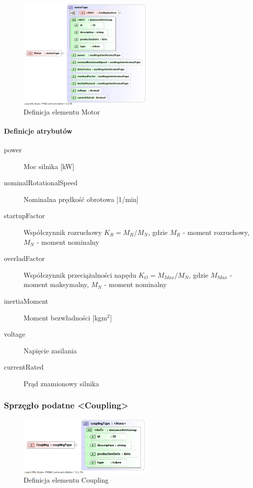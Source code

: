 \documentclass[12pt,a4paper]{article}
\begin{document}
\begin{figure}[h]
  \centering
  \includegraphics[width=0.6\textwidth]{png/liquid/Motor}
  \caption{Definicja elementu Motor}
  \label{fig:motor-xsd}
\end{figure}

\paragraph{Definicje atrybutów}
\begin{description}
\item[power] Moc silnika [kW]
\item[nominalRotationalSpeed] Nominalna prędkość obrotowa [1/min]
\item[startupFactor] Współczynnik rozruchowy $K_R = M_R/M_N$,
	gdzie $M_R$ - moment rozruchowy, $M_N$ - moment nominalny
\item[overladFactor] Współczynnik przeciążalności napędu $K_O = M_{Max}/M_N$,
	gdzie $M_{Max}$ - moment maksymalny, $M_N$ - moment nominalny
\item[inertiaMoment] Moment bezwładności [kgm$^2$]
\item[voltage] Napięcie zasilania
\item[currentRated] Prąd znamionowy silnika
\end{description}

\subsubsection{Sprzęgło podatne <Coupling>}

\begin{figure}[h]
  \centering
  \includegraphics[width=0.6\textwidth]{png/liquid/Coupling}
  \caption{Definicja elementu Coupling}
  \label{fig:coupling-xsd}
\end{figure}
\end{document}
